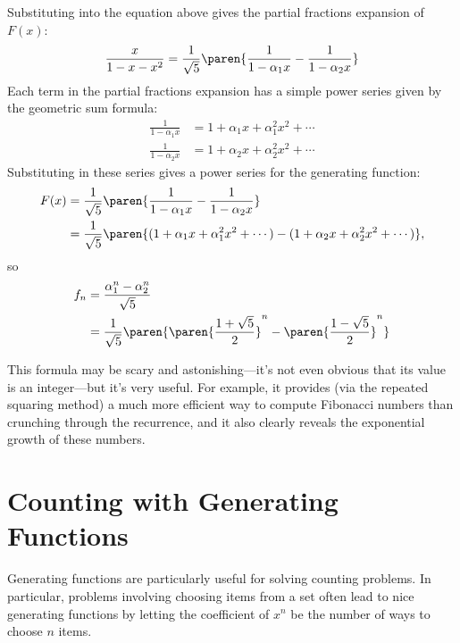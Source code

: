Substituting into the equation above gives the partial fractions
expansion of $F(x)$:
%
\[
\frac{x}{1 - x - x^2} =
        \frac{1}{\sqrt{5}}
        \paren{\frac{1}{1 - \alpha_1 x} - \frac{1}{1 - \alpha_2 x}}
\]
%
Each term in the partial fractions expansion has a simple power series
given by the geometric sum formula:
%
\begin{align*}
\frac{1}{1 - \alpha_1 x} & = 1 + \alpha_1 x + \alpha_1^2 x^2 + \cdots \\
\frac{1}{1 - \alpha_2 x} & = 1 + \alpha_2 x + \alpha_2^2 x^2 + \cdots
\end{align*}
%
Substituting in these series gives a power series for the generating
function:
%
\begin{align*}
F(x) & =
  \frac{1}{\sqrt{5}}
  \paren{\frac{1}{1 - \alpha_1 x} -
        \frac{1}{1 - \alpha_2 x}}\\
    & = \frac{1}{\sqrt{5}}
        \paren{(1 + \alpha_1 x + \alpha_1^2 x^2 + \cdots) -
        (1 + \alpha_2 x + \alpha_2^2 x^2 + \cdots)},
\end{align*}
so
\begin{align*}
 f_n & = \frac{\alpha_1^n - \alpha_2^n}{\sqrt{5}} \\
                & = \frac{1}{\sqrt{5}}
        \paren{
         \paren{\frac{1 + \sqrt{5}}{2}}^n -
         \paren{\frac{1 - \sqrt{5}}{2}}^n}
\end{align*}

This formula may be scary and astonishing---it's not even obvious that
its value is an integer---but it's very useful.  For example, it provides
(via the repeated squaring method) a much more efficient way to compute
Fibonacci numbers than crunching through the recurrence, and it also
clearly reveals the exponential growth of these numbers.

\begin{problems}
\classproblems
{}

\homeworkproblems
{}

\end{problems}

\section{Counting with Generating Functions}

Generating functions are particularly useful for solving counting
problems.  In particular, problems involving choosing items from a set
often lead to nice generating functions by letting the coefficient of
$x^n$ be the number of ways to choose $n$ items.

